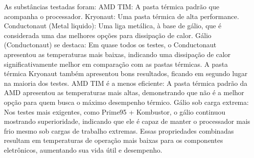 \documentclass{article}
\begin{document}
As substâncias testadas foram:
AMD TIM: A pasta térmica padrão que acompanha o processador.
Kryonaut: Uma pasta térmica de alta performance.
Conductonaut (Metal liquido): Uma liga metálica, à base de gálio, que é considerada uma das melhores opções para dissipação de calor.
Gálio (Conductonaut) se destaca: Em quase todos os testes, o Conductonaut apresentou as temperaturas mais baixas, indicando uma dissipação de calor significativamente melhor em comparação com as pastas térmicas.
A pasta térmica Kryonaut também apresentou bons resultados, ficando em segundo lugar na maioria dos testes.
AMD TIM é a menos eficiente: A pasta térmica padrão da AMD apresentou as temperaturas mais altas, demonstrando que não é a melhor opção para quem busca o máximo desempenho térmico.
Gálio sob carga extrema: Nos testes mais exigentes, como Prime95 + Kombustor, o gálio continuou mostrando superioridade, indicando que ele é capaz de manter o processador mais frio mesmo sob cargas de trabalho extremas.
Essas propriedades combinadas resultam em temperaturas de operação mais baixas para os componentes eletrônicos, aumentando sua vida útil e desempenho.
\end{document}
